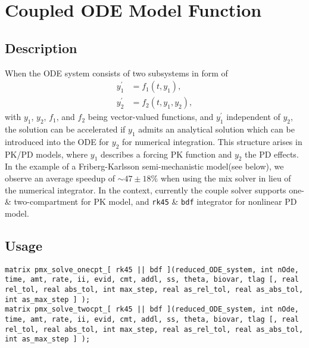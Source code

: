 \documentclass[12pt, reqno, oneside]{amsbook}
\numberwithin{equation}{chapter}
\numberwithin{figure}{chapter}
\numberwithin{table}{chapter}
\theoremstyle{remark}
\begin{document}
\section{Coupled ODE Model Function}
\label{sec:org9ff6f77}
\subsection{Description}
\label{sec:org997c5ba}
When the ODE system consists of two subsystems in form of
\begin{align*}
  y_1^\prime &= f_1(t, y_1), \\
  y_2^\prime &= f_2(t, y_1, y_2),
\end{align*}
with \(y_1\), \(y_2\), \(f_1\), and \(f_2\) being vector-valued functions, and
\(y_1^\prime\) independent of \(y_2\), the solution can be
accelerated if \(y_1\) admits an analytical solution which can
be introduced into the ODE for \(y_2\) for numerical
integration. This structure arises in PK/PD
models, where \(y_1\) describes a forcing PK function and \(y_2\) the PD
effects. In the example of a Friberg-Karlsson
semi-mechanistic model(see below), we observe an average speedup of
\(\sim 47 \pm 18 \%\) when using the mix solver in lieu of the numerical
integrator. In the context, currently the couple solver supports one-
\& two-compartment for PK model, and \texttt{rk45} \&
\texttt{bdf} integrator for nonlinear PD model.
\subsection{Usage}
\label{sec:orga2d9dc1}
\begin{verbatim}
matrix pmx_solve_onecpt_[ rk45 || bdf ](reduced_ODE_system, int nOde, time, amt, rate, ii, evid, cmt, addl, ss, theta, biovar, tlag [, real rel_tol, real abs_tol, int max_step, real as_rel_tol, real as_abs_tol, int as_max_step ] );
matrix pmx_solve_twocpt_[ rk45 || bdf ](reduced_ODE_system, int nOde, time, amt, rate, ii, evid, cmt, addl, ss, theta, biovar, tlag [, real rel_tol, real abs_tol, int max_step, real as_rel_tol, real as_abs_tol, int as_max_step ] );
\end{verbatim}
\end{document}
